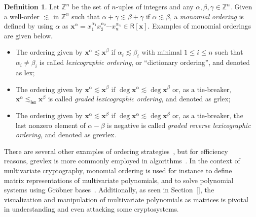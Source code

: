 \documentclass[draft, 12pt, a4paper, oneside]{memoir}
\theoremstyle{definition}
\newtheorem{definition}[theorem]{Definition}
\begin{document}
\begin{definition}
  Let $\mathbb{Z}^{n}$ be the set of $n$-uples of integers and any $\alpha, \beta, \gamma \in \mathbb{Z}^{n}$. Given a well-order $\lesssim$ in $\mathbb{Z}^{n}$ such that $\alpha + \gamma \lesssim \beta + \gamma$ if $\alpha \lesssim \beta$, a \emph{monomial ordering} is defined by using $\alpha$ as $\mathbf{x}^{\alpha} = x_{1}^{\alpha_{1}} x_{2}^{\alpha_{2}} \cdots x_{n}^{\alpha_{n}} \in \mathsf{R}[\mathbf{x}]$. Examples of monomial orderings are given below.
  
  \begin{itemize}
    \item The ordering given by $\mathbf{x}^{\alpha} \lesssim \mathbf{x}^{\beta}$ if $\alpha_{i} \lesssim \beta_{i}$ with minimal $1 \leq i \leq n$ such that $\alpha_{i} \neq \beta_{i}$ is called \emph{lexicographic ordering}, or ``dictionary ordering'', and denoted as \textsf{lex};
    \item The ordering given by $\mathbf{x}^{\alpha} \lesssim \mathbf{x}^{\beta}$ if $\deg \mathbf{x}^{\alpha} \lesssim \deg \mathbf{x}^{\beta}$ or, as a tie-breaker, $\mathbf{x}^{\alpha} \lesssim_{\mathsf{lex}} \mathbf{x}^{\beta}$ is called \emph{graded lexicographic ordering}, and denoted as \textsf{grlex};
    \item The ordering given by $\mathbf{x}^{\alpha} \lesssim \mathbf{x}^{\beta}$ if $\deg \mathbf{x}^{\alpha} \lesssim \deg \mathbf{x}^{\beta}$ or, as a tie-breaker, the last nonzero element of $\alpha - \beta$ is negative is called \emph{graded reverse lexicographic ordering}, and denoted as \textsf{grevlex}.
  \end{itemize}
\end{definition}

There are several other examples of ordering strategies~\cite{}, but for efficiency reasons, \textsf{grevlex} is more commonly employed in algorithms~\cite{}. In the context of multivariate cryptography, monomial ordering is used for instance to define matrix representations of multivariate polynomials, and to solve polynomial systems using Gröbner bases~\cite{}. Additionally, as seen in Section~\ref{}, the visualization and manipulation of multivariate polynomials as matrices is pivotal in understanding and even attacking some cryptosystems.
\end{document}
